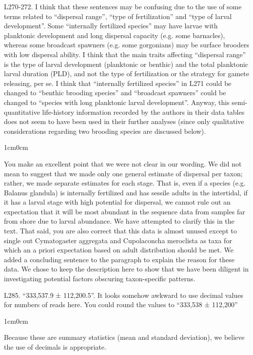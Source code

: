 \documentclass{article}
\newenvironment{response}
	{
	\begin{adjustwidth}{1cm}{0cm}
	\color{peerjBlue}
	}
	{
	\end{adjustwidth}
	}
\begin{document}
L270-272. I think that these sentences may be confusing due to the use of some terms related to ``dispersal range'', ``type of fertilization'' and ``type of larval development''. Some ``internally fertilized species'' may have larvae with planktonic development and long dispersal capacity (e.g. some barnacles), whereas some broadcast spawners (e.g. some gorgonians) may be surface brooders with low dispersal ability. I think that the main traits affecting ``dispersal range'' is the type of larval development (planktonic or benthic) and the total planktonic larval duration (PLD), and not the type of fertilization or the strategy for gamete releasing, per se. I think that ``internally fertilized species'' in L271 could be changed to ``benthic brooding species'' and ``broadcast spawners'' could be changed to ``species with long planktonic larval development''. Anyway, this semi-quantitative life-history information recorded by the authors in their data tables does not seem to have been used in their further analyses (since only qualitative considerations regarding two brooding species are discussed below).
\begin{response}
  You make an excellent point that we were not clear in our wording.
	We did not mean to suggest that we made only one general estimate of dispersal per taxon; rather, we made separate estimates for each stage.
	That is, even if a species (e.g. Balanus glandula) is internally fertilized and has sessile adults in the intertidal, if it has a larval stage with high potential for dispersal, we cannot rule out an expectation that it will be most abundant in the sequence data from samples far from shore due to larval abundance.
	We have attempted to clarify this in the text.
	That said, you are also correct that this data is almost unused except to single out Cymatogaster aggregata and Cupolaconcha meroclista as taxa for which an a priori expectation based on adult distribution should be met.
	We added a concluding sentence to the paragraph to explain the reason for these data.
	We chose to keep the description here to show that we have been diligent in investigating potential factors obscuring taxon-specific patterns.
	\\
\end{response}

L285. ``333,537.9 ± 112,200.5''. It looks somehow awkward to use decimal values for numbers of reads here. You could round the values to ``333,538 ± 112,200''
\begin{response}
  Because these are summary statistics (mean and standard deviation), we believe the use of decimals is appropriate.\\
\end{response}
\end{document}
